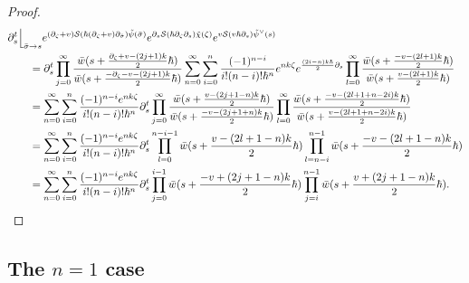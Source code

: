 \documentclass[10pt,a4paper,oneside,no-math,reqno]{amsart}%
\theoremstyle{plain}
\theoremstyle{definition}
\theoremstyle{remark}
\numberwithin{equation}{section}
\newcommand{\mc}[1]{\mathcal{#1}}
\newcommand{\1}{\mathds{1}}
\newcommand{\<}{\langle}
\renewcommand{\>}{\rangle}
\newcommand{\del}{\partial}
\begin{document}
\begin{proof}
	\begin{align*}
			&
			\del_s^t \Big\lfloor_{\bar{\sigma} \to s}
			e^{ (\del_\zeta + v) \mc{S}( \hbar (\del_\zeta + v) \del_{\bar{\sigma}} )\tilde{\psi} (\bar{\sigma}) }
			e^{ \del_s \mc{S}( \hbar \del_\zeta \del_s) \tilde{\chi} (\zeta) }
			e^{v \mc{S}(v \hbar \del_s ) \tilde{\psi}^\vee (s)}
			\\
			&\qquad=
			\del_s^t
			\prod_{j = 0}^ \infty \frac{\bar{w} ( s + \frac{\del_\zeta + v- (2j + 1) k}{2} \hbar)}{\bar{w} ( s + \frac{- \del_\zeta -v- (2j + 1) k}{2} \hbar)}
			\sum_{n=0}^\infty \sum_{i = 0}^n \frac{(-1)^{n-i}}{i!(n-i)!\hbar^n} e^{nk\zeta}  e^{\frac{(2i-n)k \hbar}{2} \del_s}
			\prod_{l = 0}^ \infty \frac{\bar{w} (s + \frac{-v- (2l + 1) k}{2} \hbar)}{\bar{w} (s + \frac{v- (2l + 1) k}{2} \hbar)}
			\\
			&\qquad=
			\sum_{n=0}^\infty \sum_{i = 0}^n \frac{(-1)^{n-i} e^{ nk \zeta} }{i!(n-i)! \hbar^n } 
			\del_s^t
			\prod_{j = 0}^ \infty \frac{\bar{w} ( s + \frac{ v- (2j + 1 - n) k}{2} \hbar)}{\bar{w} ( s + \frac{-v- (2j + 1 + n) k}{2} \hbar)}
			\prod_{l = 0}^ \infty \frac{\bar{w} ( s + \frac{-v- (2l + 1 + n - 2i) k}{2} \hbar)}{\bar{w} ( s + \frac{v- (2l + 1 + n - 2i) k}{2} \hbar)}
			\\ 						%
			&\qquad=
			\sum_{n=0}^\infty \sum_{i = 0}^n \frac{(-1)^{n-i} e^{ nk \zeta} }{i!(n-i)! \hbar^n } 
			\del_s^t
			\prod_{l = 0}^{n-i-1} \bar{w} ( s + \frac{ v- (2l + 1 - n) k}{2} \hbar)
			\prod_{l = n-i}^{n-1} \bar{w} ( s + \frac{-v- (2l + 1 - n) k}{2} \hbar)
			\\
			&\qquad=
			\sum_{n=0}^\infty \sum_{i = 0}^n \frac{(-1)^{n-i} e^{ nk \zeta}}{i!(n-i)! \hbar^n } 
			\del_s^t
			\prod_{j = 0}^{i-1} \bar{w} ( s + \frac{-v+ (2j+1-n) k}{2} \hbar)
			\prod_{j = i}^{n-1} \bar{w} ( s + \frac{ v+ (2j+1-n) k}{2} \hbar) . \qedhere
	\end{align*}
\end{proof}

\subsection{The \texorpdfstring{$n=1$}{n=1} case}
\end{document}
